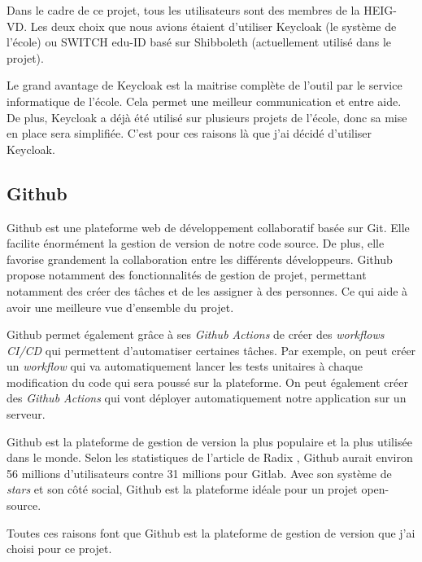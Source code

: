Dans le cadre de ce projet, tous les utilisateurs sont des membres de la HEIG-VD. Les deux choix que nous avions étaient d'utiliser Keycloak (le système de l'école) ou SWITCH edu-ID basé sur Shibboleth (actuellement utilisé dans le projet).

Le grand avantage de Keycloak est la maitrise complète de l'outil par le service informatique de l'école. Cela permet une meilleur communication et entre aide. De plus, Keycloak a déjà été utilisé sur plusieurs projets de l'école, donc sa mise en place sera simplifiée.
C'est pour ces raisons là que j'ai décidé d'utiliser Keycloak.

\subsection{Github}
Github est une plateforme web de développement collaboratif basée sur Git. Elle facilite énormément la gestion de version de notre code source. De plus, elle favorise grandement la collaboration entre les différents développeurs. Github propose notamment des fonctionnalités de gestion de projet, permettant notamment des créer des tâches et de les assigner à des personnes. Ce qui aide à avoir une meilleure vue d'ensemble du projet.

Github permet également grâce à ses \emph{Github Actions} de créer des \emph{workflows CI/CD} qui permettent d'automatiser certaines tâches. Par exemple, on peut créer un \emph{workflow} qui va automatiquement lancer les tests unitaires à chaque modification du code qui sera poussé sur la plateforme. On peut également créer des \emph{Github Actions} qui vont déployer automatiquement notre application sur un serveur.

Github est la plateforme de gestion de version la plus populaire et la plus utilisée dans le monde. Selon les statistiques de l'article de Radix \cite{Radix}, Github aurait environ 56 millions d'utilisateurs contre 31 millions pour Gitlab. Avec son système de \emph{stars} et son côté social, Github est la plateforme idéale pour un projet open-source.

Toutes ces raisons font que Github est la plateforme de gestion de version que j'ai choisi pour ce projet.
\newpage
